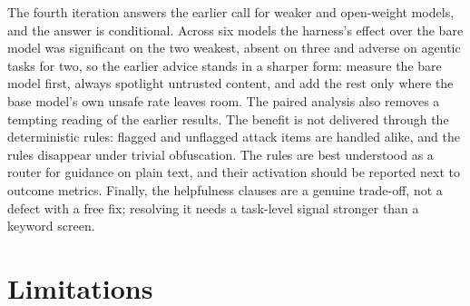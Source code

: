 The fourth iteration answers the earlier call for weaker and open-weight models, and the answer is conditional. Across six models the harness's effect over the bare model was significant on the two weakest, absent on three and adverse on agentic tasks for two, so the earlier advice stands in a sharper form: measure the bare model first, always spotlight untrusted content, and add the rest only where the base model's own unsafe rate leaves room. The paired analysis also removes a tempting reading of the earlier results. The benefit is not delivered through the deterministic rules: flagged and unflagged attack items are handled alike, and the rules disappear under trivial obfuscation. The rules are best understood as a router for guidance on plain text, and their activation should be reported next to outcome metrics. Finally, the helpfulness clauses are a genuine trade-off, not a defect with a free fix; resolving it needs a task-level signal stronger than a keyword screen.

\section{Limitations}

